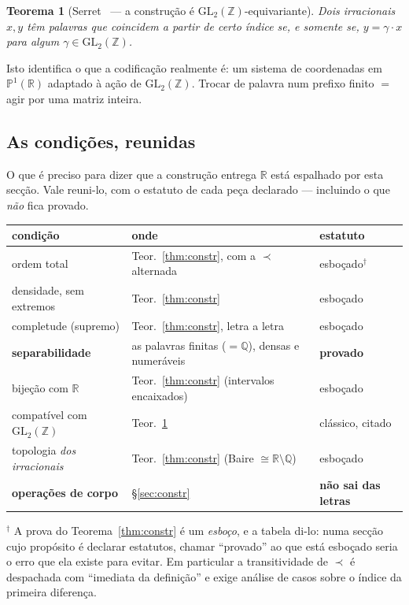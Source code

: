 \documentclass[11pt,a4paper]{article}
\theoremstyle{plain}
\newtheorem{teorema}{Teorema}[section]
\theoremstyle{definition}
\theoremstyle{remark}
\newcommand{\R}{\mathbb{R}}
\newcommand{\Q}{\mathbb{Q}}
\newcommand{\Z}{\mathbb{Z}}
\newcommand{\Pj}{\mathbb{P}^1}
\newcommand{\GL}{\mathrm{GL}}
\begin{document}
\begin{teorema}[Serret~\cite{serret} --- a construção é $\GL_2(\Z)$-equivariante]\label{thm:serret}
Dois irracionais $x,y$ têm palavras que coincidem a partir de certo índice se, e somente se,
$y = \gamma\cdot x$ para algum $\gamma\in\GL_2(\Z)$.
\end{teorema}

\noindent
Isto identifica o que a codificação realmente é: um sistema de coordenadas em $\Pj(\R)$ adaptado
à ação de $\GL_2(\Z)$. Trocar de palavra num prefixo finito $=$ agir por uma matriz inteira.

\subsection{As condições, reunidas}\label{sec:condicoes}

O que é preciso para dizer que a construção entrega $\R$ está espalhado por esta secção. Vale reuni-lo,
com o estatuto de cada peça declarado --- incluindo o que \emph{não} fica provado.

\begin{center}\small
\begin{tabular}{lll}
\hline
condição & onde & estatuto \\ \hline
ordem total & Teor.~\ref{thm:constr}, com a $\prec$ alternada & esboçado$^\dagger$ \\
densidade, sem extremos & Teor.~\ref{thm:constr} & esboçado \\
completude (supremo) & Teor.~\ref{thm:constr}, letra a letra & esboçado \\
\textbf{separabilidade} & as palavras finitas ($=\Q$), densas e numeráveis & \textbf{provado} \\
bijeção com $\R$ & Teor.~\ref{thm:constr} (intervalos encaixados) & esboçado \\
compatível com $\GL_2(\Z)$ & Teor.~\ref{thm:serret} & clássico, citado \\
topologia \emph{dos irracionais} & Teor.~\ref{thm:constr} (Baire $\cong\R\setminus\Q$) & esboçado \\[2pt]
\textbf{operações de corpo} & \S\ref{sec:constr} & \textbf{não sai das letras} \\
\hline
\end{tabular}
\end{center}

\noindent $^\dagger$ A prova do Teorema~\ref{thm:constr} é um \emph{esboço}, e a tabela di-lo:
numa secção cujo propósito é declarar estatutos, chamar ``provado'' ao que está esboçado seria o
erro que ela existe para evitar. Em particular a transitividade de $\prec$ é despachada com
``imediata da definição'' e exige análise de casos sobre o índice da primeira diferença.
\end{document}
